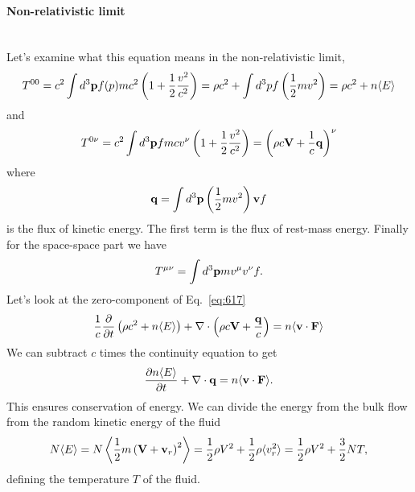 \paragraph{Non-relativistic limit}
\label{sec:non-relat-limit}
\\

Let's examine what this equation means in the non-relativistic limit,
\begin{equation}
T^{00} = c^2 \int d^3 {\bf p} f(p) m c^2 \left ( 1 +
\frac{1}{2}\frac{v^2}{c^2} \right )= \rho c^2 + \int d^3 p f \left (
\frac{1}{2} m v^2 \right ) = \rho c^2 + n \langle E \rangle
\label{eq:618}
\end{equation}
and
\begin{equation}
T^{0\nu} = c^2 \int d^3 {\bf p} f m c v^\nu \left ( 1 +
\frac{1}{2}\frac{v^2}{c^2}\right ) = \left ( \rho c {\bf V} +
\frac{1}{c} {\bf q} \right )^{\nu}
\label{eq:619}
\end{equation}
where
\begin{equation}
{\bf q} = \int d^3 {\bf p} \left ( \frac{1}{2} m v^2 \right ) {\bf v} f
\label{eq:620}
\end{equation}
is the flux of kinetic energy.  The first term is the flux of
rest-mass energy.  Finally for the space-space part we have
\begin{equation}
T^{\mu\nu} = \int d^3{\bf p} m v^\mu v^\nu f.
\label{eq:621}
\end{equation}
Let's look at the zero-component of Eq.~\ref{eq:617} 
\begin{equation}
\frac{1}{c} \frac{\partial {}}{\partial {t}} \left ( \rho c^2 + n \langle E \rangle \right ) + \nabla
\cdot \left ( \rho c {\bf V} + \frac{\bf q}{c} \right ) = n \langle
      {\bf v} \cdot {\bf F} \rangle
\label{eq:622}
\end{equation}
We can subtract $c$ times the continuity equation to get
\begin{equation}
\frac{\partial {n \langle E \rangle}}{\partial {t}} + \nabla \cdot {\bf q} = n \langle
      {\bf v} \cdot {\bf F} \rangle.
\label{eq:623}
\end{equation}
This ensures conservation of energy.  We can divide the energy from
the bulk flow from the random kinetic energy of the fluid
\begin{equation}
N \langle E \rangle = N \left \langle \frac{1}{2} m \left ( {\bf V} + {\bf v}_r
\right )^2 \right \rangle = \frac{1}{2} \rho V^2 + \frac{1}{2} \rho
\langle v_r^2 \rangle = \frac{1}{2} \rho V^2 + \frac{3}{2} N T,
\label{eq:624}
\end{equation}
defining the temperature $T$ of the fluid.

